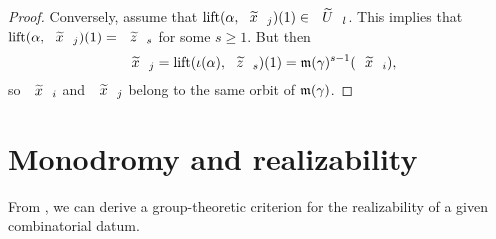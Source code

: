 \begin{proof}
Conversely, assume that $\lift{\alpha}{\wtilde{x}_j}(1)\in\wtilde{U}_l$. This implies that $\lift{\alpha}{\wtilde{x}_j}(1)=\wtilde{z}_s$ for some $s\ge 1$. But then
\[
\wtilde{x}_j=\lift{\invpath{\alpha}}{\wtilde{z}_s}(1)=\Mon(\gamma)^{s-1}(\wtilde{x}_i),
\]
so $\wtilde{x}_i$ and $\wtilde{x}_j$ belong to the same orbit of $\mathfrak{m}(\gamma)$.
\end{proof}

\section{Monodromy and realizability}

From , we can derive a group-theoretic criterion for the realizability of a given combinatorial datum.

